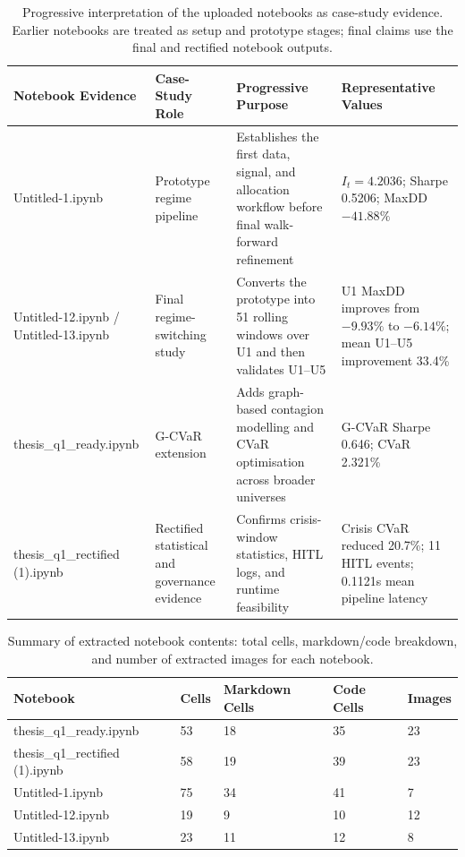 \documentclass[11pt]{article}
\begin{document}
\begin{table}[htbp]
\centering
\small
\begin{tabular}{L{3.2cm}L{3.3cm}L{4.2cm}L{3.2cm}}
\toprule
\textbf{Notebook Evidence} & \textbf{Case-Study Role} & \textbf{Progressive Purpose} & \textbf{Representative Values} \\
\midrule
Untitled-1.ipynb & Prototype regime pipeline & Establishes the first data, signal, and allocation workflow before final walk-forward refinement & $I_t=4.2036$; Sharpe 0.5206; MaxDD $-41.88\%$ \\
Untitled-12.ipynb / Untitled-13.ipynb & Final regime-switching study & Converts the prototype into 51 rolling windows over U1 and then validates U1--U5 & U1 MaxDD improves from $-9.93\%$ to $-6.14\%$; mean U1--U5 improvement 33.4\% \\
thesis\_q1\_ready.ipynb & G-CVaR extension & Adds graph-based contagion modelling and CVaR optimisation across broader universes & G-CVaR Sharpe 0.646; CVaR 2.321\% \\
thesis\_q1\_rectified (1).ipynb & Rectified statistical and governance evidence & Confirms crisis-window statistics, HITL logs, and runtime feasibility & Crisis CVaR reduced 20.7\%; 11 HITL events; 0.1121s mean pipeline latency \\
\bottomrule
\end{tabular}
\caption{Progressive interpretation of the uploaded notebooks as case-study evidence. Earlier notebooks are treated as setup and prototype stages; final claims use the final and rectified notebook outputs.}
\label{tab:notebook_case_progression}
\end{table}

\begin{table}[htbp]
\centering
\small
\begin{tabular}{L{4.0cm}C{1.5cm}C{2.0cm}C{2.0cm}C{2.0cm}}
\toprule
\textbf{Notebook} & \textbf{Cells} & \textbf{Markdown Cells} & \textbf{Code Cells} & \textbf{Images} \\
\midrule
thesis\_q1\_ready.ipynb & 53 & 18 & 35 & 23 \\
thesis\_q1\_rectified (1).ipynb & 58 & 19 & 39 & 23 \\
Untitled-1.ipynb & 75 & 34 & 41 & 7 \\
Untitled-12.ipynb & 19 & 9 & 10 & 12 \\
Untitled-13.ipynb & 23 & 11 & 12 & 8 \\
\bottomrule
\end{tabular}
\caption{Summary of extracted notebook contents: total cells, markdown/code breakdown, and number of extracted images for each notebook.}
\label{tab:notebook_extraction_summary}
\end{table}
\end{document}
